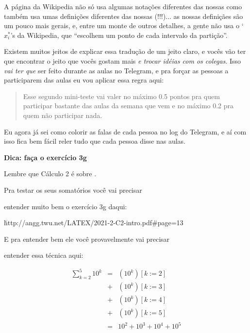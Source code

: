 \documentclass[oneside,12pt]{article}
\begin{document}
{{{  }

  \ssk

  A página da Wikipedia não só usa algumas notações diferentes das
  nossas como também usa umas definições diferentes das nossas
  (!!!)... as nossas definiçães são um pouco mais gerais, e, entre um
  monte de outros detalhes, a gente não usa o `$x_i^*$'s da Wikipedia,
  que ``escolhem um ponto de cada intervalo da partição''.

  Existem muitos jeitos de explicar essa tradução de um jeito claro, e
  vocês vão ter que encontrar o jeito que vocês gostam mais {\sl e
    trocar idéias com os colegas}. Isso {\sl vai ter que} ser feito
  durante as aulas no Telegram, e pra forçar as pessoas a participarem
  das aulas eu vou aplicar essa regra aqui:

  \begin{quote}

    Esse segundo mini-teste vai valer no máximo 0.5 pontos pra quem
    participar bastante das aulas da semana que vem e no máximo 0.2 pra
    quem não participar nada.

  \end{quote}

  Eu agora já sei como colorir as falas de cada pessoa no log do
  Telegram, e aí com isso fica bem fácil reler tudo que cada pessoa
  disse nas aulas.

}}






\newpage

{\bf Dica: faça o exercício 3g}

Lembre que Cálculo 2 é sobre .

Pra testar os seus somatórios você vai precisar

entender muito bem o exercício 3g daqui:

  \u{http://angg.twu.net/LATEX/2021-2-C2-intro.pdf\#page=13}

E pra entender bem ele você provavelmente vai precisar

entender essa técnica aqui:

  $$\begin{array}{rcl}
      \sum_{k=2}^{5} 10^k &=& (10^k) [k:=2] \\
                          &+& (10^k) [k:=3] \\
                          &+& (10^k) [k:=4] \\
                          &+& (10^k) [k:=5] \\[2.5pt]
                          &=& 10^2 + 10^3 + 10^4 + 10^5 \\
    \end{array}
  $$
\end{document}
